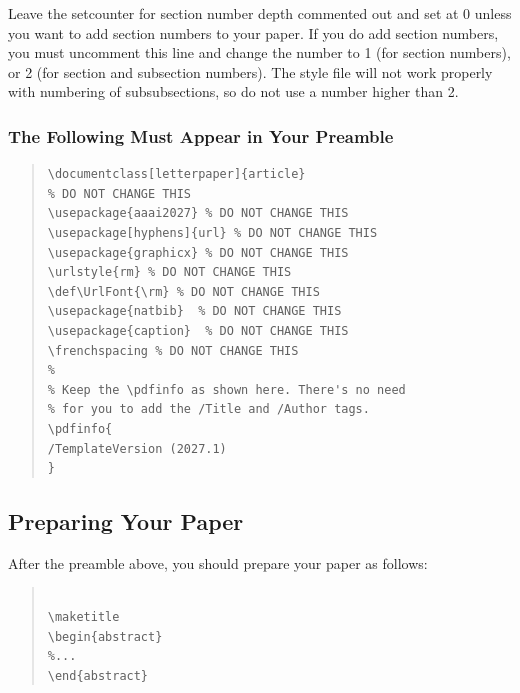 Leave the setcounter for section number depth commented out and set at 0 unless you want to add section numbers to your paper. If you do add section numbers, you must uncomment this line and change the number to 1 (for section numbers), or 2 (for section and subsection numbers). The style file will not work properly with numbering of subsubsections, so do not use a number higher than 2.

\subsubsection{The Following Must Appear in Your Preamble}
\begin{quote}
\begin{scriptsize}\begin{verbatim}
\documentclass[letterpaper]{article}
% DO NOT CHANGE THIS
\usepackage{aaai2027} % DO NOT CHANGE THIS
\usepackage[hyphens]{url} % DO NOT CHANGE THIS
\usepackage{graphicx} % DO NOT CHANGE THIS
\urlstyle{rm} % DO NOT CHANGE THIS
\def\UrlFont{\rm} % DO NOT CHANGE THIS
\usepackage{natbib}  % DO NOT CHANGE THIS
\usepackage{caption}  % DO NOT CHANGE THIS
\frenchspacing % DO NOT CHANGE THIS
%
% Keep the \pdfinfo as shown here. There's no need
% for you to add the /Title and /Author tags.
\pdfinfo{
/TemplateVersion (2027.1)
}
\end{verbatim}\end{scriptsize}
\end{quote}

\subsection{Preparing Your Paper}

After the preamble above, you should prepare your paper as follows:
\begin{quote}
\begin{scriptsize}\begin{verbatim}

\maketitle
\begin{abstract}
%...
\end{abstract}\end{verbatim}\end{scriptsize}
\end{quote}

